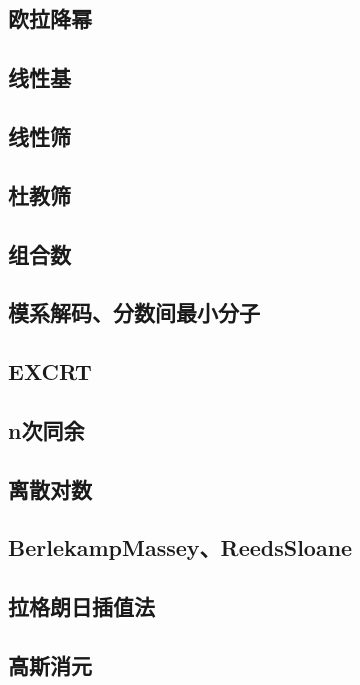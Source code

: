\documentclass[10pt,a4paper]{article}
\begin{document}
\subsection{欧拉降幂}

\subsection{线性基}

\subsection{线性筛}

\subsection{杜教筛}

\subsection{组合数}

\subsection{模系解码、分数间最小分子}

\subsection{EXCRT}

\subsection{n次同余}

\subsection{离散对数}

\subsection{BerlekampMassey、ReedsSloane}

\subsection{拉格朗日插值法}

\subsection{高斯消元}

\end{document}
